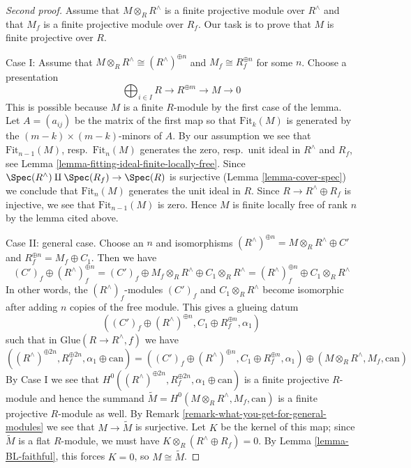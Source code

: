 \begin{proof}[Second proof]
Assume that $M \otimes_R R^\wedge$ is a finite projective module over
$R^\wedge$ and that $M_f$ is a finite projective module over $R_f$.
Our task is to prove that $M$ is finite projective over $R$.

\medskip\noindent
Case I: Assume that $M \otimes_R R^\wedge \cong (R^\wedge)^{\oplus n}$
and $M_f \cong R_f^{\oplus n}$ for some $n$. Choose a presentation
$$
\bigoplus\nolimits_{i \in I} R \to R^{\oplus m} \to M \to 0
$$
This is possible because $M$ is a finite $R$-module by the first case
of the lemma. Let $A = (a_{ij})$ be the matrix of the first map so that
$\text{Fit}_k(M)$ is generated by the $(m - k) \times (m - k)$-minors
of $A$. By our assumption we see that
$\text{Fit}_{n - 1}(M)$, resp.\ $\text{Fit}_n(M)$
generates the zero, resp.\ unit ideal in $R^\wedge$ and $R_f$, see
Lemma \ref{lemma-fitting-ideal-finite-locally-free}.
Since $\Spec(R^\wedge) \amalg \Spec(R_f) \to \Spec(R)$ is surjective
(Lemma \ref{lemma-cover-spec}) we conclude that $\text{Fit}_n(M)$
generates the unit ideal in $R$. Since $R \to R^\wedge \oplus R_f$
is injective, we see that $\text{Fit}_{n - 1}(M)$ is zero.
Hence $M$ is finite locally free of rank $n$ by the lemma cited
above.

\medskip\noindent
Case II: general case. Choose an $n$ and isomorphisms
$(R^\wedge)^{\oplus n} = M \otimes_R R^\wedge \oplus C'$
and $R_f^{\oplus n} = M_f \oplus C_1$. Then we have
$$
(C')_f \oplus (R^\wedge)_f^{\oplus n} =
(C')_f \oplus M_f \otimes_R R^\wedge \oplus C_1 \otimes_R R^\wedge =
(R^\wedge)_f^{\oplus n} \oplus C_1 \otimes_R R^\wedge
$$
In other words, the $(R^\wedge)_f$-modules $(C')_f$ and
$C_1 \otimes_R R^\wedge$ become isomorphic after adding
$n$ copies of the free module. This gives a glueing datum
$$
((C')_f \oplus (R^\wedge)^{\oplus n}, C_1 \oplus R_f^{\oplus n}, \alpha_1)
$$
such that in $\text{Glue}(R \to R^\wedge, f)$ we have
$$
((R^\wedge)^{\oplus 2n}, R_f^{\oplus 2n}, \alpha_1 \oplus \text{can})
=
((C')_f \oplus (R^\wedge)^{\oplus n}, C_1 \oplus R_f^{\oplus n}, \alpha_1)
\oplus
(M \otimes_R R^\wedge, M_f, \text{can})
$$
By Case I we see that
$H^0((R^\wedge)^{\oplus 2n}, R_f^{\oplus 2n}, \alpha_1 \oplus \text{can})$
is a finite projective $R$-module and hence the summand
$\tilde M = H^0(M \otimes_R R^\wedge, M_f, \text{can})$ is a
finite projective $R$-module as well. By
Remark \ref{remark-what-you-get-for-general-modules}
we see that $M \to \tilde M$ is surjective.
Let $K$ be the kernel of this map; since  $\tilde M$ is a flat $R$-module,
we must have $K \otimes_R (R^\wedge \oplus R_f) = 0$.
By Lemma \ref{lemma-BL-faithful}, this forces $K = 0$, so $M \cong \tilde M$.
\end{proof}


